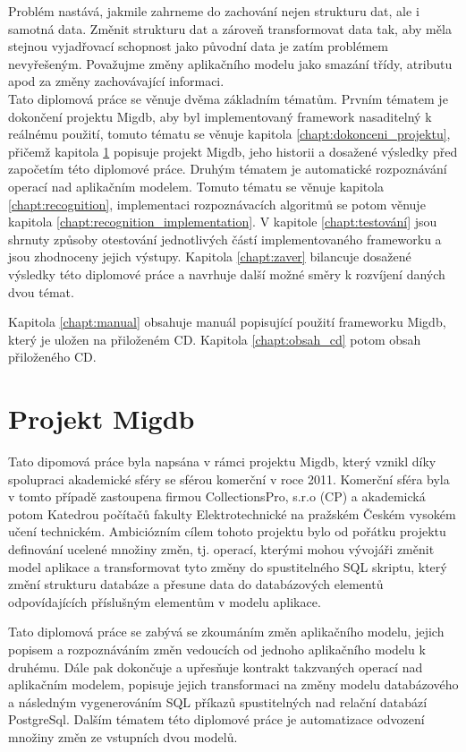 \documentclass[11pt,twoside,a4paper]{book}
\begin{document}
Problém nastává, jakmile zahrneme do zachování nejen strukturu dat, ale i
samotná data. Změnit strukturu dat a zároveň transformovat data tak, aby měla
stejnou vyjadřovací schopnost jako původní data je zatím problémem nevyřešeným.
Považujme změny aplikačního modelu jako smazání třídy, atributu apod za změny
zachovávající informaci. \\

Tato diplomová práce se věnuje dvěma základním tématům. Prvním tématem je
dokončení projektu Migdb, aby byl implementovaný framework nasaditelný k
reálnému použití, tomuto tématu se věnuje kapitola
\ref{chapt:dokonceni_projektu}, přičemž kapitola \ref{chapt:projekt_migdb}
popisuje projekt Migdb, jeho historii a dosažené výsledky před započetím této
diplomové práce. Druhým tématem je automatické rozpoznávání operací nad
aplikačním modelem. Tomuto tématu se věnuje kapitola \ref{chapt:recognition},
implementaci rozpoznávacích algoritmů se potom věnuje kapitola
\ref{chapt:recognition_implementation}. V kapitole \ref{chapt:testování} jsou
shrnuty způsoby otestování jednotlivých částí implementovaného frameworku a
jsou zhodnoceny jejich výstupy. Kapitola \ref{chapt:zaver} bilancuje dosažené
výsledky této diplomové práce a navrhuje další možné směry k rozvíjení daných
dvou témat.

Kapitola \ref{chapt:manual} obsahuje manuál popisující použití frameworku Migdb,
který je uložen na přiloženém CD. Kapitola \ref{chapt:obsah_cd} potom obsah
přiloženého CD.



\chapter{Projekt Migdb}\label{chapt:projekt_migdb}

Tato dipomová práce byla napsána v rámci projektu Migdb, který vznikl díky
spolupraci akademické sféry se sférou komerční v roce 2011. Komerční sféra byla
v tomto případě zastoupena firmou CollectionsPro, s.r.o (CP) a
akademická potom Katedrou počítačů fakulty Elektrotechnické na pražském
Českém vysokém učení technickém. Ambiciózním cílem tohoto projektu bylo od
pořátku projektu definování ucelené množiny změn, tj. operací, kterými mohou
vývojáři změnit model aplikace a transformovat tyto změny do spustitelného SQL
skriptu, který změní strukturu databáze a přesune data do
databázových elementů odpovídajících příslušným elementům v modelu aplikace.

Tato diplomová práce se zabývá se zkoumáním změn aplikačního modelu, jejich
popisem a rozpoznáváním změn vedoucích od jednoho aplikačního modelu
k druhému. Dále pak dokončuje a upřesňuje kontrakt takzvaných operací nad
aplikačním modelem, popisuje jejich transformaci na změny modelu databázového
a následným vygenerováním SQL příkazů spustitelných nad relační databází
PostgreSql. Dalším tématem této diplomové práce je automatizace odvození množiny
změn ze vstupních dvou modelů.\\
\end{document}
